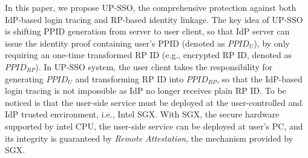 In this paper, we propose UP-SSO, 
the comprehensive protection against both IdP-based login tracing and RP-based identity linkage.
The key idea of UP-SSO is shifting PPID generation from server to user client,
so that IdP server can issue the identity proof containing user's PPID (denoted as $PPID_U$), by only requiring an one-time transformed RP ID (e.g., encrypted RP ID, denoted as $PPID_{RP}$). 
In UP-SSO system, the user client takes the responsibility for generating $PPID_U$ and transforming RP ID into $PPID_{RP}$,
so that the IdP-based login tracing is not impossible as IdP no longer receives plain RP ID.
To be noticed is that the user-side service must be deployed at the user-controlled and IdP trusted environment, i.e., Intel SGX. 
With SGX, the secure hardware supported by intel CPU, the user-side service can be deployed at user's PC, and its integrity is guaranteed by \emph{Remote Attestation}, the mechanism provided by SGX.



